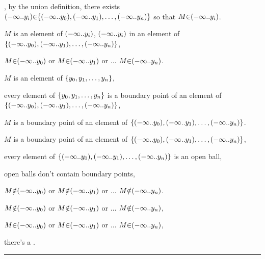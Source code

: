 , by the union definition, there exists $\a(\p-\infty \a{..} y_i\a) \p\in \a\{\a(\p-\infty\a{..}y_0\a), \a(\p-\infty\a{..}y_1\a), \ldots, \a(\p-\infty\a{..}y_n\a)\a\}$ so that $M \p\in \a(\p-\infty \a{..} y_i\a)$. \par
{} $M$ is an element of $\a(\p-\infty \a{..} y_i\a)$,  $\a(\p-\infty \a{..} y_i\a)$ in an element of $\a\{\a(\p-\infty\a{..}y_0\a), \a(\p-\infty\a{..}y_1\a), \ldots, \a(\p-\infty\a{..}y_n\a)\a\}$, \par
{} $M \p\in \a(\p-\infty\a{..}y_0\a)$ or $M \p\in \a(\p-\infty\a{..}y_1\a)$ or $\ldots$ $M \p\in \a(\p-\infty\a{..}y_n\a)$. \par

\vs
{} $M$ is an element of $\a\{y_0, y_1, \ldots, y_n\a\}$, \par
{} every element of $\a\{y_0, y_1, \ldots, y_n\a\}$ is a boundary point of an element of $\a\{\a(\p-\infty\a{..}y_0\a), \a(\p-\infty\a{..}y_1\a), \ldots, \a(\p-\infty\a{..}y_n\a)\a\}$, \par
{} $M$ is a boundary point of an element of $\a\{\a(\p-\infty\a{..}y_0\a), \a(\p-\infty\a{..}y_1\a), \ldots, \a(\p-\infty\a{..}y_n\a)\a\}$. \par
{} $M$ is a boundary point of an element of $\a\{\a(\p-\infty\a{..}y_0\a), \a(\p-\infty\a{..}y_1\a), \ldots, \a(\p-\infty\a{..}y_n\a)\a\}$, \par
{} every element of $\a\{\a(\p-\infty\a{..}y_0\a), \a(\p-\infty\a{..}y_1\a), \ldots, \a(\p-\infty\a{..}y_n\a)\a\}$ is an open ball, \par
{} open balls don't contain boundary points, \par
{} $M \p\notin \a(\p-\infty\a{..}y_0\a)$ or $M \p\notin \a(\p-\infty\a{..}y_1\a)$ or $\ldots$ $M \p\notin \a(\p-\infty\a{..}y_n\a)$. \par

\vs
{} $M \p\notin \a(\p-\infty\a{..}y_0\a)$ or $M \p\notin \a(\p-\infty\a{..}y_1\a)$ or $\ldots$ $M \p\notin \a(\p-\infty\a{..}y_n\a)$, \par
{}   $M \p\in \a(\p-\infty\a{..}y_0\a)$ or $M \p\in \a(\p-\infty\a{..}y_1\a)$ or $\ldots$ $M \p\in \a(\p-\infty\a{..}y_n\a)$, \par
{}  there's a . \par



\vs\hrule\vskip1pt
